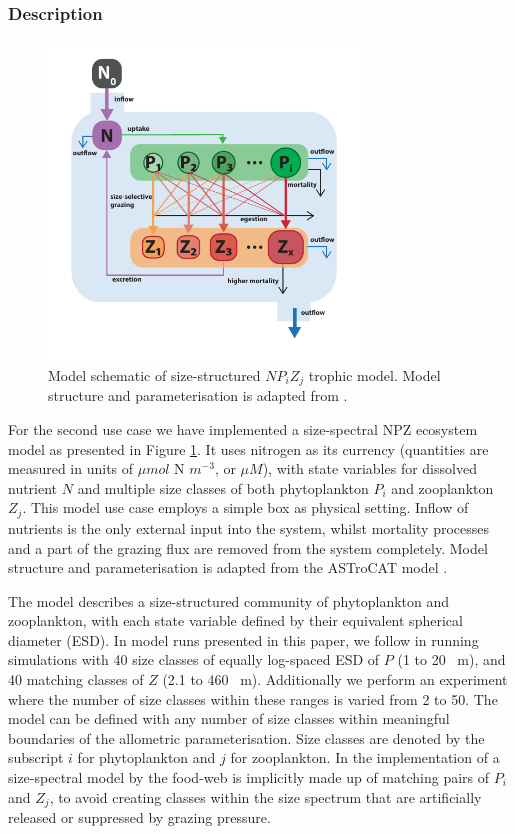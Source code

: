 \documentclass[journal abbreviation, manuscript]{copernicus}
\begin{document}
\subsubsection{Description}
\begin{figure}[t]
\includegraphics[width=8.3cm]{Figures/firstdraft_schematics/03_schematics_ASTroCAT.pdf}
\caption{Model schematic of size-structured $NP_{i}Z_{j}$ trophic model. Model structure and parameterisation is adapted from \citet{Banas2011b}.}
\label{Figure:ModelSchematics_3}
\end{figure}

For the second use case we have implemented a size-spectral NPZ ecosystem model as presented in Figure \ref{Figure:ModelSchematics_3}. It uses nitrogen as its currency (quantities are measured in units of $\mu mol$ N $m^{-3}$, or $\mu M$), with state variables for dissolved nutrient $N$ and multiple size classes of both phytoplankton $P_i$ and zooplankton $Z_j$. 
This model use case employs a simple box as physical setting. Inflow of nutrients is the only external input into the system, whilst mortality processes and a part of the grazing flux are removed from the system completely. Model structure and parameterisation is adapted from the ASTroCAT model \citep{Banas2011b}.

The model describes a size-structured community of phytoplankton and zooplankton, with each state variable defined by their equivalent spherical diameter (ESD). In model runs presented in this paper, we follow \citet{Banas2011b} in running simulations with 40 size classes of equally log-spaced ESD of $P$ (1 to 20 \unit{\mu m}), and 40 matching classes of $Z$ (2.1 to 460  \unit{\mu m}). Additionally we perform an experiment where the number of size classes within these ranges is varied from 2 to 50.
The model can be defined with any number of size classes within meaningful boundaries of the allometric parameterisation. Size classes are denoted by the subscript $i$ for phytoplankton and $j$ for zooplankton. In the implementation of a size-spectral model by \citeauthor{Banas2011b} the food-web is implicitly made up of matching pairs of $P_i$ and $Z_j$, to avoid creating classes within the size spectrum that are artificially released or suppressed by grazing pressure.
\end{document}
